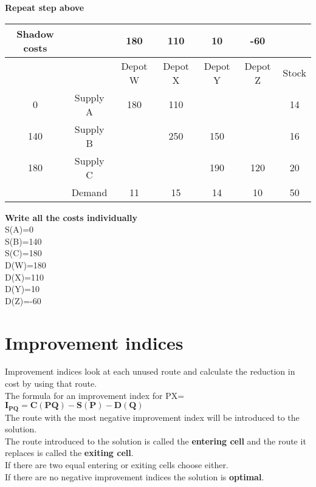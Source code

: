 \documentclass{article}[18pt]
\newcommand{\cred}[1]{\color{red}#1}
\begin{document}
\textbf{Repeat step above}
\begin{center}
\begin{tabular}{ |c|c|c|c|c|c|c| }
\hline
Shadow costs&&180&110&10&-60&\\
\hline
&&Depot W&Depot X&Depot Y&Depot Z&Stock\\
\hline
0&Supply A&\cred{180}&\cred{110}&&&14\\
\hline
140&Supply B&&\cred{250}&\cred{150}&&16\\
\hline
180&Supply C&&&\cred{190}&\cred{120}&20\\
\hline
&Demand&11&15&14&10&50\\
\hline
\end{tabular}
\end{center}
\textbf{Write all the costs individually}\\
S(A)=0\\
S(B)=140\\
S(C)=180\\
D(W)=180\\
D(X)=110\\
D(Y)=10\\
D(Z)=-60\\
\section{Improvement indices}
Improvement indices look at each unused route and calculate the reduction in cost by using that route.\\
The formula for an improvement index for PX= $\mathbf{I_{PQ}=C(PQ)-S(P)-D(Q)}$\\
The route with the most negative improvement index will be introduced to the solution.\\
The route introduced to the solution is called the \textbf{entering cell} and the route it replaces is called the \textbf{exiting cell}.\\
If there are two equal entering or exiting cells choose either.\\
If there are no negative improvement indices the solution is \textbf{optimal}.
\end{document}
